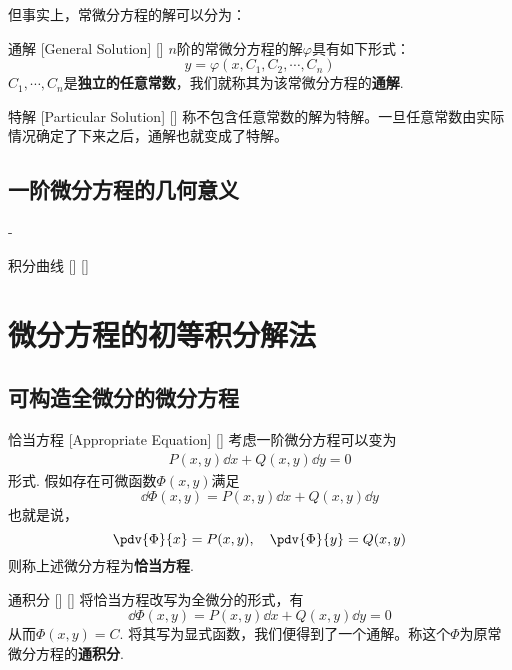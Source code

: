 \documentclass[UTF8]{ctexart}
\begin{document}
        但事实上，常微分方程的解可以分为：

        \begin{dfn}
            []
            {通解}
            [General Solution]
            []
            $n$阶的常微分方程的解$\varphi$具有如下形式：
            \[y=\varphi(x,C_1,C_2,\cdots,C_n)\]
            $C_1,\cdots,C_n$是\textbf{独立的任意常数}，我们就称其为该常微分方程的\textbf{通解}.
        \end{dfn}

        \begin{dfn}
            []
            {特解}
            [Particular Solution]
            []
            称不包含任意常数的解为特解。一旦任意常数由实际情况确定了下来之后，通解也就变成了特解。
        \end{dfn}

    \subsection{一阶微分方程的几何意义}-                           

        \begin{dfn}
            []
            {积分曲线}
            []
            []

        \end{dfn}

\section{微分方程的初等积分解法}

    \subsection{可构造全微分的微分方程}

        \begin{dfn}
            []
            {恰当方程}
            [Appropriate Equation]
            []
            考虑一阶微分方程可以变为
            \begin{align*}
                P(x,y)\dd{x}+Q(x,y)\dd{y}=0\tag{$\star$}
            \end{align*}
            形式. 假如存在可微函数$\Phi(x,y)$满足
            \[\dd\Phi(x,y)=P(x,y)\dd{x}+Q(x,y)\dd{y}\]
            也就是说，
            \[\pdv{\Phi}{x}=P(x,y),\quad\pdv{\Phi}{y}=Q(x,y)\]
            则称上述微分方程为\textbf{恰当方程}. 
        \end{dfn}

        \begin{dfn}
            []
            {通积分}
            []
            []
            将恰当方程改写为全微分的形式，有
            \[\dd\Phi(x,y)=P(x,y)\dd{x}+Q(x,y)\dd{y}=0\]
            从而$\Phi(x,y)=C$. 将其写为显式函数，我们便得到了一个通解。称这个$\Phi$为原常微分方程的\textbf{通积分}.
        \end{dfn}
\end{document}
